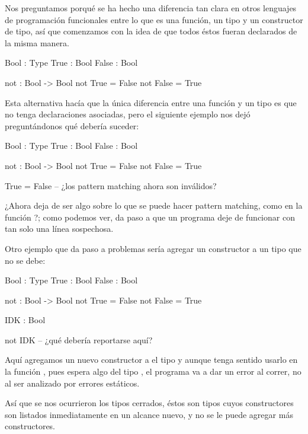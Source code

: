 \begin{designfr}
Nos preguntamos porqué se ha hecho una diferencia tan clara en otros lenguajes de programación funcionales entre lo que es una función, un tipo y un constructor de tipo, así que comenzamos con la idea de que todos éstos fueran declarados de la misma manera.

\begin{anglercode}
Bool : Type
True : Bool
False : Bool

not : Bool -> Bool
not True = False
not False = True
\end{anglercode}

Esta alternativa hacía que la única diferencia entre una función y un tipo es que no tenga declaraciones asociadas, pero el siguiente ejemplo nos dejó preguntándonos qué debería suceder:

\begin{anglercode}
Bool : Type
True : Bool
False : Bool

not : Bool -> Bool
not True = False
not False = True

True = False    -- ¿los pattern matching ahora son inválidos?
\end{anglercode}

¿Ahora  deja de ser algo sobre lo que se puede hacer pattern matching, como en la función ?; como podemos ver, da paso a que un programa deje de funcionar con tan solo una línea sospechosa.

Otro ejemplo que da paso a problemas sería agregar un constructor a un tipo que no se debe:

\begin{anglercode}
Bool : Type
True : Bool
False : Bool

not : Bool -> Bool
not True = False
not False = True

IDK : Bool

not IDK         -- ¿qué debería reportarse aquí?
\end{anglercode}

Aquí agregamos un nuevo constructor a el tipo  y aunque tenga sentido usarlo en la función , pues espera algo del tipo , el programa va a dar un error al correr, no al ser analizado por errores estáticos.

Así que se nos ocurrieron los tipos cerrados, éstos son tipos cuyos constructores son listados inmediatamente en un alcance nuevo, y no se le puede agregar más constructores.


\end{designfr}
